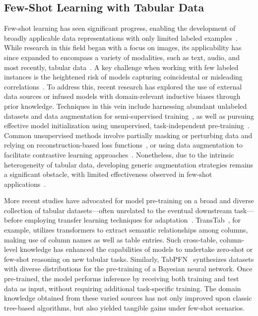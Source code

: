 \subsection{Few-Shot Learning with Tabular Data} Few-shot learning has seen significant progress, enabling the development of broadly applicable data representations with only limited labeled examples~\cite{chen2018closer}. While research in this field began with a focus on images, its applicability has since expanded to encompass a variety of modalities, such as text, audio, and most recently, tabular data~\cite{majumder2022few,nam2023stunt,schick2021exploiting}. A key challenge when working with few labeled instances is the heightened risk of models capturing coincidental or misleading correlations~\cite{bartlett2021deep}. To address this, recent research has explored the use of external data sources or infused models with domain-relevant inductive biases through prior knowledge. Techniques in this vein include harnessing abundant unlabeled datasets and data augmentation for semi-supervised training~\cite{ucar2021subtab,yoon2020vime}, as well as pursuing effective model initialization using unsupervised, task-independent pre-training~\cite{somepalli2021saint}. Common unsupervised methods involve partially masking or perturbing data and relying on reconstruction-based loss functions~\cite{arik2021tabnet,majmundar2022met}, or using data augmentation to facilitate contrastive learning approaches~\cite{bahri2022scarf,chen2020simple}. Nonetheless, due to the intrinsic heterogeneity of tabular data, developing generic augmentation strategies remains a significant obstacle, with limited effectiveness observed in few-shot applications~\cite{nam2023stunt}.

More recent studies have advocated for model pre-training on a broad and diverse collection of tabular datasets—often unrelated to the eventual downstream task—before employing transfer learning techniques for adaptation~\cite{zhang2023generative,levin2022transfer,zhu2023xtab}. TransTab~\cite{wang2022transtab}, for example, utilizes transformers to extract semantic relationships among columns, making use of column names as well as table entries. Such cross-table, column-level knowledge has enhanced the capabilities of models to undertake zero-shot or few-shot reasoning on new tabular tasks. Similarly, TabPFN~\cite{hollmann2022tabpfn} synthesizes datasets with diverse distributions for the pre-training of a Bayesian neural network. Once pre-trained, the model performs inference by receiving both training and test data as input, without requiring additional task-specific training. The domain knowledge obtained from these varied sources has not only improved upon classic tree-based algorithms, but also yielded tangible gains under few-shot scenarios.

